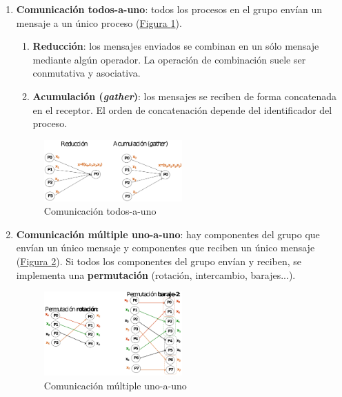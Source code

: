 \documentclass[10pt,a4paper,spanish]{report}
\begin{document}
\begin{enumerate}[\color{azul}{\bf $\heartsuit$}]
    \item \textcolor[rgb]{0.2,0.4,0.8}{\textbf{Comunicación todos-a-uno}}: todos los procesos en el grupo envían un mensaje a un único proceso (\hyperref[comunicacion_todos_a_uno]{Figura \ref*{comunicacion_todos_a_uno}}).
    \begin{enumerate}[$\longrightarrow$]
        \item \textcolor[rgb]{0.2,0.4,0.8}{\textbf{Reducción}}: los mensajes enviados se combinan en un sólo mensaje mediante algún operador. La operación de combinación suele ser conmutativa y asociativa.
        \item \textcolor[rgb]{0.2,0.4,0.8}{\textbf{Acumulación (\textit{gather})}}: los mensajes se reciben de forma concatenada en el receptor. El orden de concatenación depende del identificador del proceso.
    \end{enumerate}
    \begin{figure}[!h]
        \centering
        \includegraphics[width=0.5\textwidth]{30}
        \caption{Comunicación todos-a-uno}
        \label{comunicacion_todos_a_uno}
    \end{figure}
    \item \textcolor[rgb]{0.2,0.4,0.8}{\textbf{Comunicación múltiple uno-a-uno}}: hay componentes del grupo que envían un único mensaje y componentes que reciben un único mensaje (\hyperref[comunicacion_mult_uno_a_uno]{Figura \ref*{comunicacion_mult_uno_a_uno}}). Si todos los componentes del grupo envían y reciben, se implementa una \textbf{\textcolor[rgb]{0.2,0.4,0.8}{permutación}} (rotación, intercambio, barajes...). 
    \begin{figure}[!h]
        \centering
        \includegraphics[width=0.5\textwidth]{28}
        \caption{Comunicación múltiple uno-a-uno}
        \label{comunicacion_mult_uno_a_uno}

\end{figure}
\end{enumerate}
\end{document}
